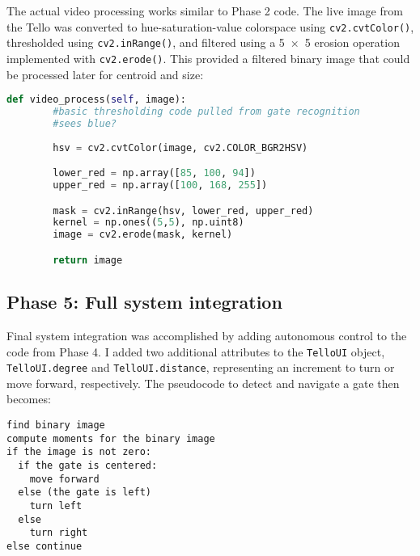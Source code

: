 The actual video processing works similar to Phase 2 code. The live image from the Tello was converted to hue-saturation-value colorspace using \lstinline{cv2.cvtColor()}, thresholded using \lstinline{cv2.inRange()}, and filtered using a \num{5x5} erosion operation implemented with \lstinline{cv2.erode()}. This provided a filtered binary image that could be processed later for centroid and size:
\begin{lstlisting}[language=python]
   def video_process(self, image):
	    #basic thresholding code pulled from gate recognition
	    #sees blue? 
	    
	    hsv = cv2.cvtColor(image, cv2.COLOR_BGR2HSV)

	    lower_red = np.array([85, 100, 94])
	    upper_red = np.array([100, 168, 255])

	    mask = cv2.inRange(hsv, lower_red, upper_red)
	    kernel = np.ones((5,5), np.uint8)
	    image = cv2.erode(mask, kernel)

	    return image
\end{lstlisting}





\subsection{Phase 5: Full system integration}
Final system integration was accomplished by adding autonomous control to the code from Phase 4. I added two additional attributes to the \lstinline{TelloUI} object, \lstinline{TelloUI.degree} and \lstinline{TelloUI.distance}, representing an increment to turn or move forward, respectively. The pseudocode to detect and navigate a gate then becomes:
\begin{lstlisting}
find binary image
compute moments for the binary image
if the image is not zero: 
  if the gate is centered:
    move forward
  else (the gate is left)
    turn left 
  else 
    turn right
else continue
\end{lstlisting}


